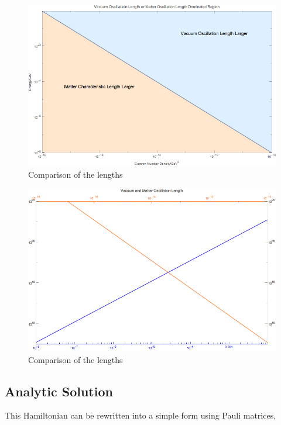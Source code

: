 \documentclass{tufte-handout}
\begin{document}
\begin{figure}
\centering
\includegraphics{assets/comparisonVacOscLengthMatterLength}
\caption{Comparison of the lengths}
\label{fig:comparisonVacOscLengthMatterLength}
\end{figure}


\begin{figure}
\centering
\includegraphics{assets/lengthComparison}
\caption{Comparison of the lengths}
\label{fig:lengthComparison}
\end{figure}







\subsection{Analytic Solution}


This Hamiltonian can be rewritten into a simple form using Pauli matrices,
\end{document}
